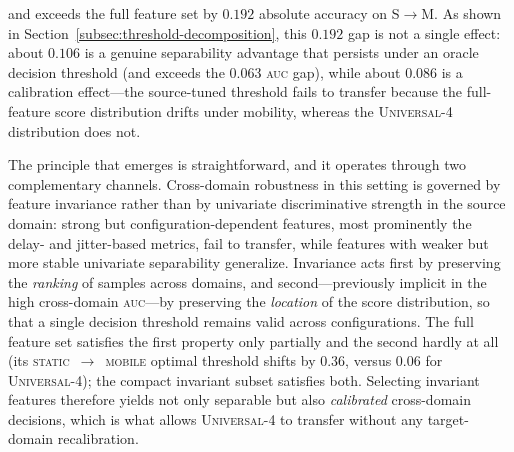 
and exceeds the full feature set by $0.192$ absolute accuracy on
S$\rightarrow$M. As shown in Section~\ref{subsec:threshold-decomposition}, this
$0.192$ gap is not a single effect: about $0.106$ is a genuine separability
advantage that persists under an oracle decision threshold (and exceeds the
$0.063$ \textsc{auc} gap), while about $0.086$ is a calibration effect---the
source-tuned threshold fails to transfer because the full-feature score
distribution drifts under mobility, whereas the \textsc{Universal-4} distribution
does not.


The principle that emerges is straightforward, and it operates through two
complementary channels. Cross-domain robustness in this setting is governed by
feature invariance rather than by univariate discriminative strength in the source
domain: strong but configuration-dependent features, most prominently the delay-
and jitter-based metrics, fail to transfer, while features with weaker but more
stable univariate separability generalize. Invariance acts first by preserving the
\emph{ranking} of samples across domains, and second---previously implicit in the
high cross-domain \textsc{auc}---by preserving the \emph{location} of the score
distribution, so that a single decision threshold remains valid across
configurations. The full feature set satisfies the first property only partially
and the second hardly at all (its \textsc{static}~$\rightarrow$~\textsc{mobile}
optimal threshold shifts by $0.36$, versus $0.06$ for \textsc{Universal-4}); the
compact invariant subset satisfies both. Selecting invariant features therefore
yields not only separable but also \emph{calibrated} cross-domain decisions, which
is what allows \textsc{Universal-4} to transfer without any target-domain
recalibration.



